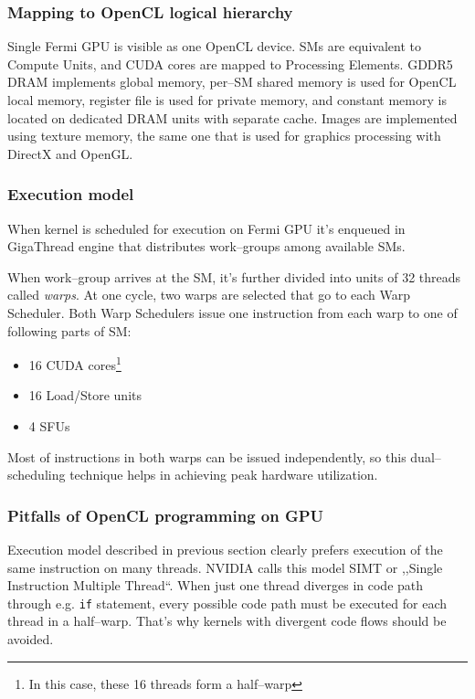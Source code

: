 \subsubsection{Mapping to OpenCL logical hierarchy}

Single Fermi GPU is visible as one OpenCL device. SMs are equivalent to Compute
Units, and CUDA cores are mapped to Processing Elements. GDDR5 DRAM implements
global memory, per--SM shared memory is used for OpenCL local memory,
register file is used for private memory, and constant memory is located on
dedicated DRAM units with separate cache. Images are implemented using texture
memory, the same one that is used for graphics processing with DirectX and OpenGL.

\subsubsection{Execution model}

When kernel is scheduled for execution on Fermi GPU it's enqueued in GigaThread
engine that distributes work--groups among available SMs.

When work--group arrives at the SM, it's further divided into units of 32 threads
called \emph{warps}. At one cycle, two warps are selected that go to each
Warp Scheduler. Both Warp Schedulers issue one instruction from each warp to
one of following parts of SM:
\begin{itemize}
  \item 16 CUDA cores\footnote{In this case, these 16 threads form a half--warp}
  \item 16 Load/Store units
  \item 4 SFUs
\end{itemize}

Most of instructions in both warps can be issued independently, so this
dual--scheduling technique helps in achieving peak hardware utilization.

\subsubsection{Pitfalls of OpenCL programming on GPU}

Execution model described in previous section clearly prefers execution of the same instruction
on many threads. NVIDIA calls this model SIMT or ,,Single Instruction Multiple
Thread``. When just one thread diverges in code path through e.g. \texttt{if}
statement, every possible code path must be executed for each thread in a half--warp.
That's why kernels with divergent code flows should be avoided.

